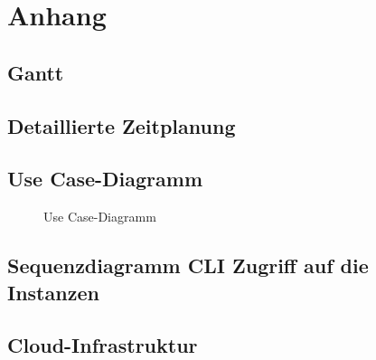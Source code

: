 \section{Anhang}
\label{sec:Anhang}
\subsection{Gantt}
\label{app:Gantt}
\clearpage

\subsection{Detaillierte Zeitplanung}
\label{app:Zeitplanung}
\clearpage

\subsection{Use Case-Diagramm}
\label{app:UseCase}
\begin{figure}[htb]
\centering
% 
\caption{Use Case-Diagramm}
\end{figure}
\clearpage

\subsection{Sequenzdiagramm CLI Zugriff auf die Instanzen}
\label{app:Sequenzdiagramm CLI Zugriff auf die Instanzen}

\subsection{Cloud-Infrastruktur}
\label{app:Cloud-Infrastruktur}

